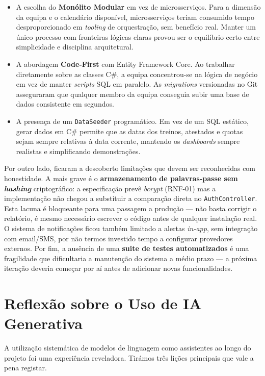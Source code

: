 \begin{itemize}
    \item A escolha do \textbf{Monólito Modular} em vez de microsserviços. Para a dimensão da equipa e o calendário disponível, microsserviços teriam consumido tempo desproporcionado em \textit{tooling} de orquestração, sem benefício real. Manter um único processo com fronteiras lógicas claras provou ser o equilíbrio certo entre simplicidade e disciplina arquitetural.
    \item A abordagem \textbf{Code-First} com Entity Framework Core. Ao trabalhar diretamente sobre as classes C\#, a equipa concentrou-se na lógica de negócio em vez de manter \textit{scripts} SQL em paralelo. As \textit{migrations} versionadas no Git asseguraram que qualquer membro da equipa conseguia subir uma base de dados consistente em segundos.
    \item A presença de um \texttt{DataSeeder} programático. Em vez de um SQL estático, gerar dados em C\# permite que as datas dos treinos, atestados e quotas sejam sempre relativas à data corrente, mantendo os \textit{dashboards} sempre realistas e simplificando demonstrações.
\end{itemize}

Por outro lado, ficaram a descoberto limitações que devem ser reconhecidas com honestidade. A mais grave é o \textbf{armazenamento de palavras-passe sem \textit{hashing}} criptográfico: a especificação prevê \textit{bcrypt} (RNF-01) mas a implementação não chegou a substituir a comparação direta no \texttt{AuthController}. Esta lacuna é bloqueante para uma passagem a produção --- não basta corrigir o relatório, é mesmo necessário escrever o código antes de qualquer instalação real. O sistema de notificações ficou também limitado a alertas \textit{in-app}, sem integração com email/SMS, por não termos investido tempo a configurar provedores externos. Por fim, a ausência de uma \textbf{suite de testes automatizados} é uma fragilidade que dificultaria a manutenção do sistema a médio prazo --- a próxima iteração deveria começar por aí antes de adicionar novas funcionalidades.

\section{Reflexão sobre o Uso de IA Generativa}

A utilização sistemática de modelos de linguagem como assistentes ao longo do projeto foi uma experiência reveladora. Tirámos três lições principais que vale a pena registar.

